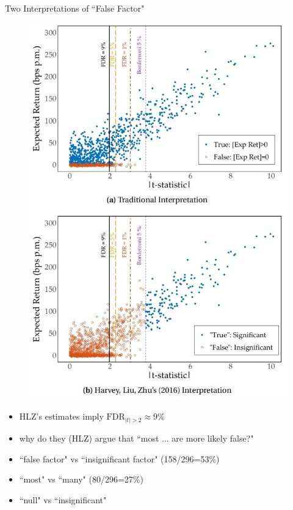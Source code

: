 \documentclass[UTF8, 16pt]{beamer}
\begin{document}
\begin{CJK*}{UTF8}{gbsn}
\begin{frame}{Two Interpretations of ``False Factor"}
\begin{multicols}{2}
	\begin{figure}[htpb]
  		\begin{center}
    	\includegraphics[width=0.88 \linewidth]
    	{pic/SMM.jpg}
  		\end{center}
	\end{figure}
	\begin{itemize}
		\item HLZ’s estimates imply $\mathrm{FDR}_{|t|>2} \approx 9 \%$
		\item why do they (HLZ) argue that ``most ... are more likely false?"
		\item ``false factor" vs ``insignificant factor"  (158/296=53\%)
		\item ``most" vs ``many" (80/296=27\%)
		\item ``null" vs ``insignificant"
	\end{itemize}
\end{multicols}

\end{frame}
\end{CJK*}
\end{document}
